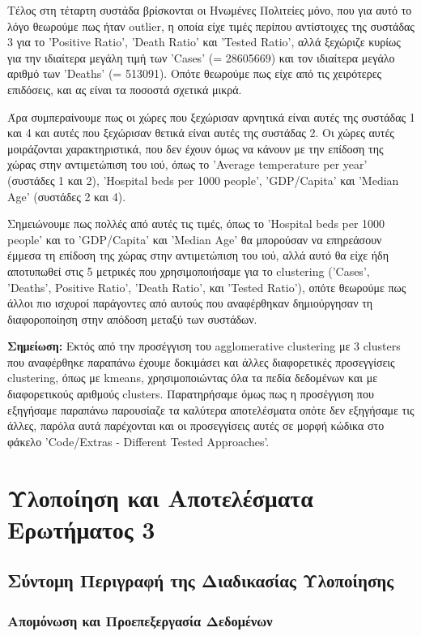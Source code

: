\documentclass[12pt,a4paper]{article}
\begin{document}
Τέλος στη τέταρτη συστάδα βρίσκονται οι Ηνωμένες Πολιτείες μόνο, που για αυτό το λόγο θεωρούμε πως ήταν outlier, η οποία είχε τιμές περίπου αντίστοιχες της συστάδας 3 για το 'Positive Ratio', 'Death Ratio' και 'Tested Ratio', αλλά ξεχώριζε κυρίως για την ιδιαίτερα μεγάλη τιμή των 'Cases' (= 28605669) και τον ιδιαίτερα μεγάλο αριθμό των 'Deaths' (= 513091). Οπότε θεωρούμε πως είχε από τις χειρότερες επιδόσεις, και ας είναι τα ποσοστά σχετικά μικρά.

Άρα συμπεραίνουμε πως οι χώρες που ξεχώρισαν αρνητικά είναι αυτές της συστάδας 1 και 4 και αυτές που ξεχώρισαν θετικά είναι αυτές της συστάδας 2. Οι χώρες αυτές μοιράζονται χαρακτηριστικά, που δεν έχουν όμως να κάνουν με την επίδοση της χώρας στην αντιμετώπιση του ιού, όπως το 'Average temperature per year' (συστάδες 1 και 2), 'Hospital beds per 1000 people', 'GDP/Capita' και 'Median Age' (συστάδες 2 και 4).

Σημειώνουμε πως πολλές από αυτές τις τιμές, όπως το 'Hospital beds per 1000 people' και το 'GDP/Capita' και 'Median Age' θα μπορούσαν να επηρεάσουν έμμεσα τη επίδοση της χώρας στην αντιμετώπιση του ιού, αλλά αυτό θα είχε ήδη αποτυπωθεί στις 5 μετρικές που χρησιμοποιήσαμε για το clustering ('Cases', 'Deaths', Positive Ratio', 'Death Ratio', και 'Tested Ratio'), οπότε θεωρούμε πως άλλοι πιο ισχυροί παράγοντες από αυτούς που αναφέρθηκαν δημιούργησαν τη διαφοροποίηση στην απόδοση μεταξύ των συστάδων.

\textbf{Σημείωση:} Εκτός από την προσέγγιση του agglomerative clustering με 3 clusters που αναφέρθηκε παραπάνω έχουμε δοκιμάσει και άλλες διαφορετικές προσεγγίσεις clustering, όπως με kmeans, χρησιμοποιώντας όλα τα πεδία δεδομένων και με διαφορετικούς αριθμούς clusters. Παρατηρήσαμε όμως πως η προσέγγιση που εξηγήσαμε παραπάνω παρουσίαζε τα καλύτερα αποτελέσματα οπότε δεν εξηγήσαμε τις άλλες, παρόλα αυτά παρέχονται και οι προσεγγίσεις αυτές σε μορφή κώδικα στο φάκελο 'Code/Extras - Different Tested Approaches'.

\section{Υλοποίηση και Αποτελέσματα Ερωτήματος 3}

\subsection{Σύντομη Περιγραφή της Διαδικασίας Υλοποίησης}

\subsubsection{Απομόνωση και Προεπεξεργασία Δεδομένων}
\end{document}
